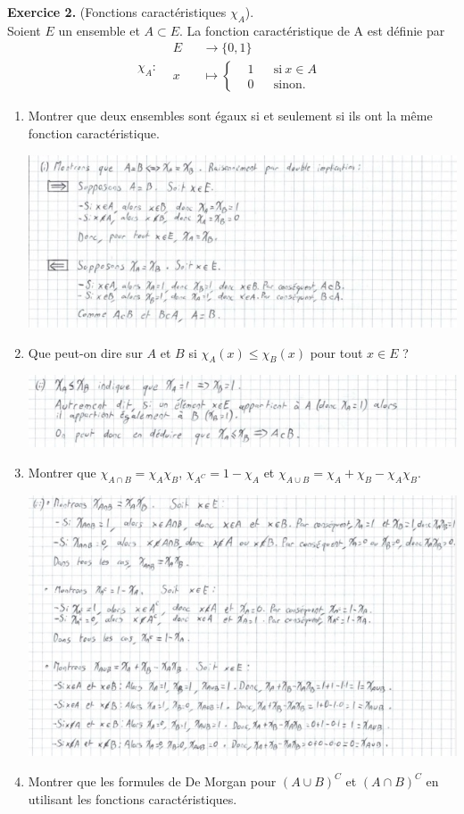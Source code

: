 \documentclass[a4paper, 10pt]{report}
\begin{document}
	\noindent
	\textbf{Exercice 2.} (Fonctions caractéristiques $\chi_A$).\\
	Soient $E$ un ensemble et $A \subset E$. La fonction
	caractéristique de A est définie par
	\[\chi_A : \begin{aligned}
		&E &&\to \{0, 1\}\\
		&x &&\mapsto \left\{
		\begin{aligned}
			&1 & &\text{si}\ x \in A\\
			&0 & &\text{sinon.}
		\end{aligned}
		\right.
	\end{aligned}\]
	
	\begin{enumerate}[label=\arabic*.]
		\item Montrer que deux ensembles sont égaux si et seulement
		si ils ont la même fonction caractéristique.
		
		\includegraphics{ex02-1.jpg}
		\item Que peut-on dire sur $A$ et $B$ si
		$\chi_A(x) \leq \chi_B(x)$ pour tout $x \in E$ ?
		
		\includegraphics{ex02-2.jpg}
		\item Montrer que $\chi_{A \cap B} = \chi_A \chi_B$,
		$\chi_{A^C} = 1 - \chi_A$ et
		$\chi_{A \cup B} = \chi_A + \chi_B - \chi_A \chi_B$.
		
		\includegraphics{ex02-3.jpg}
		\item Montrer que les formules de De Morgan pour $(A \cup B)^C$
		et $(A \cap B)^C$ en utilisant les fonctions caractéristiques.
		

\end{enumerate}
\end{document}
